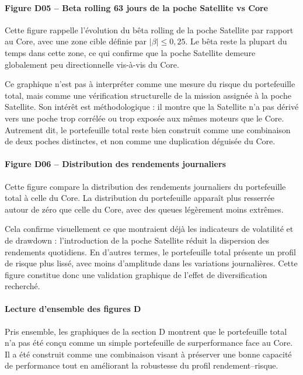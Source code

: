 \documentclass{article}
\begin{document}
\paragraph{Figure D05 -- Beta rolling 63 jours de la poche Satellite vs Core}
Cette figure rappelle l’évolution du bêta rolling de la poche Satellite par rapport au Core, avec une zone cible définie par $|\beta| \leq 0{,}25$. Le bêta reste la plupart du temps dans cette zone, ce qui confirme que la poche Satellite demeure globalement peu directionnelle vis-à-vis du Core.

Ce graphique n’est pas à interpréter comme une mesure du risque du portefeuille total, mais comme une vérification structurelle de la mission assignée à la poche Satellite. Son intérêt est méthodologique : il montre que la Satellite n’a pas dérivé vers une poche trop corrélée ou trop exposée aux mêmes moteurs que le Core. Autrement dit, le portefeuille total reste bien construit comme une combinaison de deux poches distinctes, et non comme une duplication déguisée du Core.

\paragraph{Figure D06 -- Distribution des rendements journaliers}
Cette figure compare la distribution des rendements journaliers du portefeuille total à celle du Core. La distribution du portefeuille apparaît plus resserrée autour de zéro que celle du Core, avec des queues légèrement moins extrêmes.

Cela confirme visuellement ce que montraient déjà les indicateurs de volatilité et de drawdown : l’introduction de la poche Satellite réduit la dispersion des rendements quotidiens. En d’autres termes, le portefeuille total présente un profil de risque plus lissé, avec moins d’amplitude dans les variations journalières. Cette figure constitue donc une validation graphique de l’effet de diversification recherché.

\paragraph{Lecture d’ensemble des figures D}
Pris ensemble, les graphiques de la section D montrent que le portefeuille total n’a pas été conçu comme un simple portefeuille de surperformance face au Core. Il a été construit comme une combinaison visant à préserver une bonne capacité de performance tout en améliorant la robustesse du profil rendement--risque.
\end{document}
